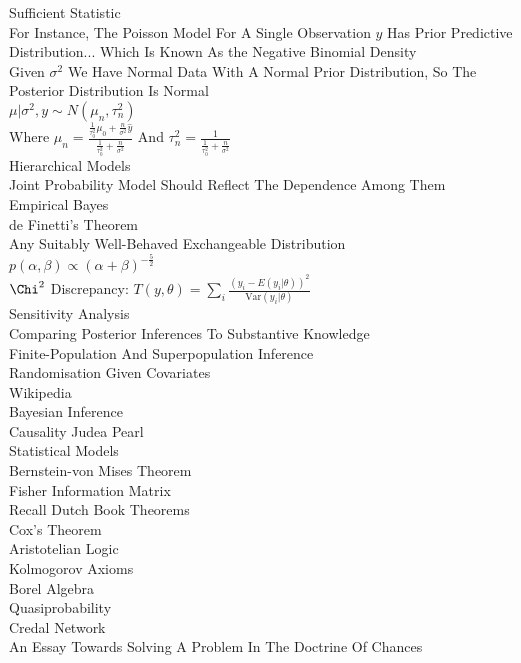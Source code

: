 Sufficient Statistic \\
For Instance, The Poisson Model For A Single Observation $y$ Has Prior Predictive Distribution... Which Is Known As the Negative Binomial Density \\
Given $\sigma^2$ We Have Normal Data With A Normal Prior Distribution, So The Posterior Distribution Is Normal \\
$\mu|\sigma^2,y\sim N(\mu_n,\tau_n^2)$ \\
Where $\mu_n=\frac{\frac{1}{\tau_0^2}\mu_0+\frac{n}{\sigma^2}\hat{y}}{\frac{1}{\tau_0^2}+\frac{n}{\sigma^2}}$ And $\tau_n^2=\frac{1}{\frac{1}{\tau_0^2}+\frac{n}{\sigma^2}}$ \\
Hierarchical Models \\
Joint Probability Model Should Reflect The Dependence Among Them \\
Empirical Bayes \\
de Finetti's Theorem \\
Any Suitably Well-Behaved Exchangeable Distribution \\
$p(\alpha,\beta)\propto (\alpha+\beta)^{-\frac{5}{2}}$ \\
$\Chi^2$ Discrepancy: $T(y,\theta)=\sum_i \frac{(y_i-E(y_i|\theta))^2}{\text{Var}(y_i|\theta)}$ \\
Sensitivity Analysis \\
Comparing Posterior Inferences To Substantive Knowledge \\
Finite-Population And Superpopulation Inference \\
Randomisation Given Covariates \\
Wikipedia \\
Bayesian Inference \\
Causality Judea Pearl \\
Statistical Models \\
Bernstein-von Mises Theorem \\
Fisher Information Matrix \\
Recall Dutch Book Theorems \\
Cox's Theorem \\
Aristotelian Logic \\
Kolmogorov Axioms \\
Borel Algebra \\
Quasiprobability \\
Credal Network \\
An Essay Towards Solving A Problem In The Doctrine Of Chances \\

